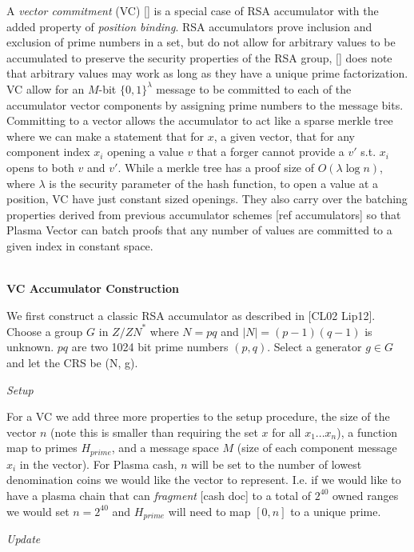\documentclass[11pt]{article}
\begin{document}
A \textit{vector commitment} (VC) [] is a special case of RSA accumulator with the added property of \textit{position binding}. RSA accumulators prove inclusion and exclusion of prime numbers in a set, but do not allow for arbitrary values to be accumulated to preserve the security properties of the RSA group, [] does note that arbitrary values may work as long as they have a unique prime factorization. VC allow for an $M$-bit $\{0,1\}^\lambda$ message to be committed to each of the accumulator vector components by assigning prime numbers to the message bits. Committing to a vector allows the accumulator to act like a sparse merkle tree where we can make a statement that for $x$, a given vector, that for any component index $x_i$ opening a value $v$ that a forger cannot provide a $v'$ s.t. $x_i$ opens to both $v$ and $v'$. While a merkle tree has a proof size of $O(\lambda \log n)$, where $\lambda$ is the security parameter of the hash function, to open a value at a position, VC have just constant sized openings. They also carry over the batching properties derived from previous accumulator schemes [ref accumulators] so that Plasma Vector can batch proofs that any number of values are committed to a given index in constant space.
\\
\\

\centerline{\textbf{VC Accumulator Construction}}

We first construct a classic RSA accumulator as described in [CL02 Lip12]. Choose a group $G$ in ${Z/ZN}^*$ where $N=pq$ and $|N| = (p-1)(q-1)$ is unknown. $pq$ are two 1024 bit prime numbers $(p,q)$. Select a generator $g \in G$ and let the CRS be (N, g). 
\\

\centerline{\textit{Setup}}

For a VC we add three more properties to the setup procedure, the size of the vector $n$ (note this is smaller than requiring the set $x$ for all $x_1...x_n$), a function map to primes $H_{prime}$, and a message space $M$ (size of each component message $x_i$ in the vector). For Plasma cash, $n$ will be set to the number of lowest denomination coins we would like the vector to represent. I.e. if we would like to have a plasma chain that can \textit{fragment} [cash doc] to a total of $2^{40}$ owned ranges we would set $n=2^{40}$ and $H_{prime}$ will need to map $[0,n]$ to a unique prime.
\\

\centerline{\textit{Update}}
\end{document}
